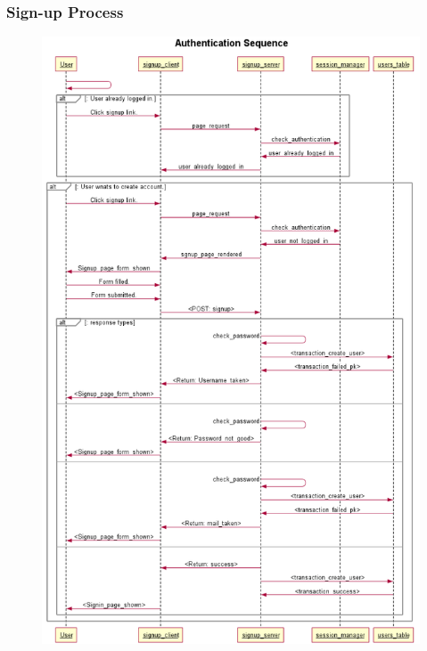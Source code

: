 \subsubsection{Sign-up Process}
\begin{figure}[H]
\centering
\includegraphics[scale=0.70]{signup}
\end{figure}

\newpage
